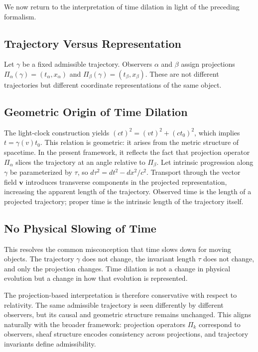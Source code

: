 \documentclass[11pt, a4paper, twocolumn]{article}
\begin{document}
We now return to the interpretation of time dilation in light of the preceding
formalism.

\subsection{Trajectory Versus Representation}

Let $\gamma$ be a fixed admissible trajectory. Observers $\alpha$ and $\beta$
assign projections $\Pi_\alpha(\gamma) = (t_\alpha,x_\alpha)$ and
$\Pi_\beta(\gamma) = (t_\beta,x_\beta)$. These are not different trajectories
but different coordinate representations of the same object.

\subsection{Geometric Origin of Time Dilation}

The light-clock construction yields $(ct)^2 = (vt)^2 + (ct_0)^2$, which implies
$t = \gamma(v)t_0$. This relation is geometric: it arises from the metric
structure of spacetime. In the present framework, it reflects the fact that
projection operator $\Pi_\alpha$ slices the trajectory at an angle relative to
$\Pi_\beta$. Let intrinsic progression along $\gamma$ be parameterized by
$\tau$, so $d\tau^2 = dt^2 - dx^2/c^2$. Transport through the vector field
$\mathbf{v}$ introduces transverse components in the projected representation,
increasing the apparent length of the trajectory. Observed time is the length
of a projected trajectory; proper time is the intrinsic length of the trajectory
itself.

\subsection{No Physical Slowing of Time}

This resolves the common misconception that time slows down for moving objects.
The trajectory $\gamma$ does not change, the invariant length $\tau$ does not
change, and only the projection changes. Time dilation is not a change in
physical evolution but a change in how that evolution is represented.

The projection-based interpretation is therefore conservative with respect to
relativity. The same admissible trajectory is seen differently by different
observers, but its causal and geometric structure remains unchanged. This aligns
naturally with the broader framework: projection operators $\Pi_k$ correspond to
observers, sheaf structure encodes consistency across projections, and trajectory
invariants define admissibility.
\end{document}
